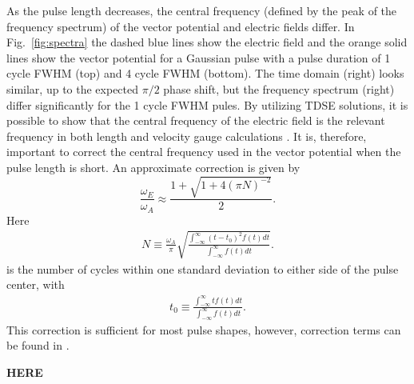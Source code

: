 As the pulse length decreases, the central frequency (defined by the peak of the frequency spectrum) of the vector potential and electric fields differ. In Fig.~\ref{fig:spectra} the dashed blue lines show the electric field and the orange solid lines show the vector potential for a Gaussian pulse with a pulse duration of 1 cycle FWHM (top) and 4 cycle FWHM (bottom). The time domain (right) looks similar, up to the expected $\pi/2$ phase shift, but the frequency spectrum (right) differ significantly for the 1 cycle FWHM pules. By utilizing TDSE solutions, it is possible to show that the central frequency of the electric field is the relevant frequency in both length and velocity gauge calculations \cite{venzke_central_2018}. 
It is, therefore, important to correct the central frequency used in the vector potential when the pulse length is short. An approximate correction is given by
\begin{equation}
\label{eq:fshift}
\frac{\omega_E}{\omega_A} 
\approx
\frac{1+\sqrt{1+4(\pi N)^{-2}}}{2}.
\end{equation}
%
Here
%
\begin{equation}
\begin{split}
\label{eq:nbar}
 N \equiv \frac{\omega_A}{\pi} \sqrt{\frac{\int_{-\infty}^{\infty} (t-t_0)^2 f(t) dt}{\int_{-\infty}^{\infty} f(t) dt}}.
\end{split}
\end{equation}
%
is the number of cycles within one standard deviation to either side of the pulse center, with
%
\begin{equation}
\begin{split}
t_0 \equiv \frac{\int_{-\infty}^{\infty} t f(t) dt}{\int_{-\infty}^{\infty} f(t) dt}.
\end{split}
\end{equation}
This correction is sufficient for most pulse shapes, however, correction terms can be found in \cite{venzke_central_2018}.




\textbf{HERE}


